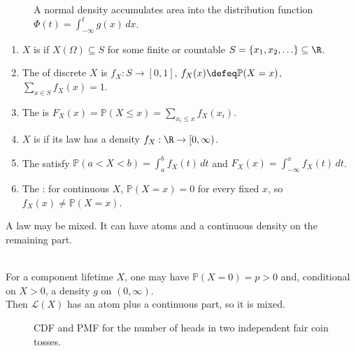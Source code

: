 \begin{figure}[H]
  \centering
  
  \caption{A normal density accumulates area into the distribution function $\Phi(t)=\int_{-\infty}^{t}g(x)\,dx$.}
  \label{fig:normal-distribution-cdf}
\end{figure}

\begin{definition} \label{def:discrete-and-continuous-random-variables} 
\begin{enumerate}[label=(\roman*)]
\setlength{\itemsep}{0pt}
\item $X$ is  if $X(\Omega)\subseteq S$ for some finite or countable $S=\{x_1,x_2,\ldots\}\subseteq\R$.
\item The  of discrete $X$ is $f_X:S\to[0,1]$, $f_X(x)\defeq\mathbb{P}(X=x)$, $\sum\limits_{x\in S}f_X(x)=1$.
\item The  is $F_X(x)=\mathbb{P}(X\leq x)=\sum\limits_{x_i\leq x}f_X(x_i)$.
\item $X$ is  if its law has a density $f_X:\R\to[0,\infty)$.
\item The  satisfy $\mathbb{P}(a<X<b)=\int_a^b f_X(t)\,dt$ and $F_X(x)=\int_{-\infty}^{x}f_X(t)\,dt$.
\item The : for continuous $X$, $\mathbb{P}(X=x)=0$ for every fixed $x$, so $f_X(x)\neq\mathbb{P}(X=x)$.
\end{enumerate}
A law may be mixed. It can have atoms and a continuous density on the remaining part.
\end{definition}

\begin{remark} \label{rem:mixed-random-variables-source-example} \\
For a component lifetime $X$, one may have $\mathbb{P}(X=0)=p>0$ and, conditional on $X>0$, a density $g$ on $(0,\infty)$.\\
Then $\mathcal{L}(X)$ has an atom plus a continuous part, so it is mixed.
\end{remark}

\begin{figure}[H]
  \centering
  
  \caption{CDF and PMF for the number of heads in two independent fair coin tosses.}
  \label{fig:coin-count-cdf-pmf}
\end{figure}

